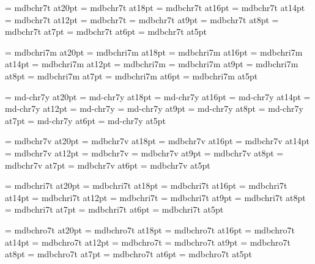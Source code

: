 
\font\twentyrm=     mdbchr7t at20pt
\font\eighteenrm=   mdbchr7t at18pt
\font\sixteenrm=    mdbchr7t at16pt
\font\fourteenrm=   mdbchr7t at14pt
\font\twelverm=     mdbchr7t at12pt
\font\tenrm=        mdbchr7t
\font\ninerm=       mdbchr7t at9pt
\font\eightrm=      mdbchr7t at8pt
\font\sevenrm=      mdbchr7t at7pt
\font\sixrm=        mdbchr7t at6pt
\font\fiverm=       mdbchr7t at5pt

\font\twentyi=      mdbchri7m at20pt
\font\eighteeni=    mdbchri7m at18pt
\font\sixteeni=     mdbchri7m at16pt
\font\fourteeni=    mdbchri7m at14pt
\font\twelvei=      mdbchri7m at12pt
\font\teni=         mdbchri7m
\font\ninei=        mdbchri7m at9pt
\font\eighti=       mdbchri7m at8pt
\font\seveni=       mdbchri7m at7pt
\font\sixi=         mdbchri7m at6pt
\font\fivei=        mdbchri7m at5pt

\font\twentysy=     md-chr7y at20pt
\font\eighteensy=   md-chr7y at18pt
\font\sixteensy=    md-chr7y at16pt
\font\fourteensy=   md-chr7y at14pt
\font\twelvesy=     md-chr7y at12pt
\font\tensy=        md-chr7y
\font\ninesy=       md-chr7y at9pt
\font\eightsy=      md-chr7y at8pt
\font\sevensy=      md-chr7y at7pt
\font\sixsy=        md-chr7y at6pt
\font\fivesy=       md-chr7y at5pt

\font\twentyex=     mdbchr7v at20pt
\font\eighteenex=   mdbchr7v at18pt
\font\sixteenex=    mdbchr7v at16pt
\font\fourteenex=   mdbchr7v at14pt
\font\twelveex=     mdbchr7v at12pt
\font\tenex=        mdbchr7v
\font\nineex=       mdbchr7v at9pt
\font\eightex=      mdbchr7v at8pt
\font\sevenex=      mdbchr7v at7pt
\font\sixex=        mdbchr7v at6pt
\font\fiveex=       mdbchr7v at5pt

\font\twentyit=     mdbchri7t at20pt
\font\eighteenit=   mdbchri7t at18pt
\font\sixteenit=    mdbchri7t at16pt
\font\fourteenit=   mdbchri7t at14pt
\font\twelveit=     mdbchri7t at12pt
\font\tenit=        mdbchri7t
\font\nineit=       mdbchri7t at9pt
\font\eightit=      mdbchri7t at8pt
\font\sevenit=      mdbchri7t at7pt
\font\sixit=        mdbchri7t at6pt
\font\fiveit=       mdbchri7t at5pt

\font\twentysl=     mdbchro7t at20pt
\font\eighteensl=   mdbchro7t at18pt
\font\sixteensl=    mdbchro7t at16pt
\font\fourteensl=   mdbchro7t at14pt
\font\twelvesl=     mdbchro7t at12pt
\font\tensl=        mdbchro7t
\font\ninesl=       mdbchro7t at9pt
\font\eightsl=      mdbchro7t at8pt
\font\sevensl=      mdbchro7t at7pt
\font\sixsl=        mdbchro7t at6pt
\font\fivesl=       mdbchro7t at5pt

